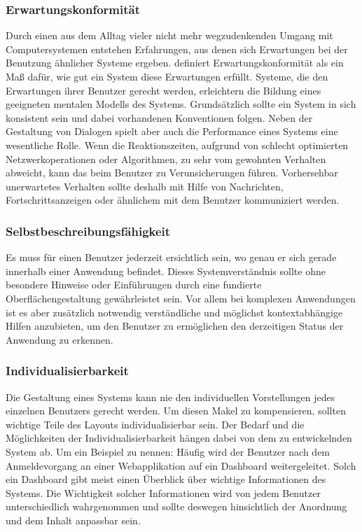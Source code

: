 \subsubsection{Erwartungskonformität}

Durch einen aus dem Alltag vieler nicht mehr wegzudenkenden Umgang mit Computersystemen entstehen Erfahrungen, aus denen sich Erwartungen bei der Benutzung ähnlicher Systeme ergeben. \citeauthor{Herczeg2009} definiert Erwartungskonformität als ein Maß dafür, wie gut ein System diese Erwartungen erfüllt. Systeme, die den Erwartungen ihrer Benutzer gerecht werden, erleichtern die Bildung eines geeigneten mentalen Modells des Systems. Grundsätzlich sollte ein System in sich konsistent sein und dabei vorhandenen Konventionen folgen. Neben der Gestaltung von Dialogen spielt aber auch die Performance eines Systems eine wesentliche Rolle. Wenn die Reaktionszeiten, aufgrund von schlecht optimierten Netzwerkoperationen oder Algorithmen, zu sehr vom gewohnten Verhalten abweicht, kann das beim Benutzer zu Verunsicherungen führen. Vorhersehbar unerwartetes Verhalten sollte deshalb mit Hilfe von Nachrichten, Fortschrittsanzeigen oder ähnlichem mit dem Benutzer kommuniziert werden. \parencite[vgl.][175\psqq]{Herczeg2009}

\subsubsection{Selbstbeschreibungsfähigkeit}

Es muss für einen Benutzer jederzeit ersichtlich sein, wo genau er sich gerade innerhalb einer Anwendung befindet. Dieses Systemverständnis sollte ohne besondere Hinweise oder Einführungen durch eine fundierte Oberflächengestaltung gewährleistet sein. Vor allem bei komplexen Anwendungen ist es aber zusätzlich notwendig verständliche und möglichst kontextabhängige Hilfen anzubieten, um den Benutzer zu ermöglichen den derzeitigen Status der Anwendung zu erkennen. \parencite[vgl.][172\psqq]{Herczeg2009}

\subsubsection{Individualisierbarkeit}

Die Gestaltung eines Systems kann nie den individuellen Vorstellungen jedes einzelnen Benutzers gerecht werden. Um diesen Makel zu kompensieren, sollten wichtige Teile des Layouts individualisierbar sein. Der Bedarf und die Möglichkeiten der Individualisierbarkeit hängen dabei von dem zu entwickelnden System ab. Um ein Beispiel zu nennen: Häufig wird der Benutzer nach dem Anmeldevorgang an einer Webapplikation auf ein Dashboard weitergeleitet. Solch ein Dashboard gibt meist einen Überblick über wichtige Informationen des Systems. Die Wichtigkeit solcher Informationen wird von jedem Benutzer unterschiedlich wahrgenommen und sollte deswegen hinsichtlich der Anordnung und dem Inhalt anpassbar sein. \parencite[vgl.][186\psqq]{Herczeg2009} 

